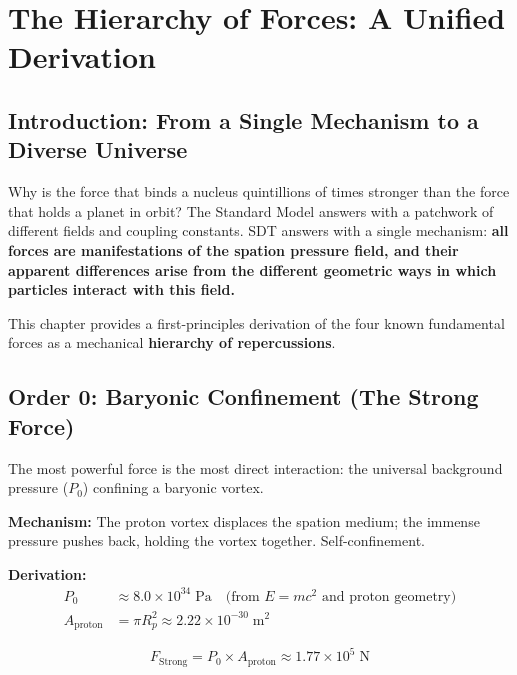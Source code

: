 \chapter{The Hierarchy of Forces: A Unified Derivation}


\section{Introduction: From a Single Mechanism to a Diverse Universe}

Why is the force that binds a nucleus quintillions of times stronger than the force that holds a planet in orbit?  The Standard Model answers with a patchwork of different fields and coupling constants.  SDT answers with a single mechanism: \textbf{all forces are manifestations of the spation pressure field, and their apparent differences arise from the different geometric ways in which particles interact with this field.}

This chapter provides a first-principles derivation of the four known fundamental forces as a mechanical \textbf{hierarchy of repercussions}.


\section{Order 0: Baryonic Confinement (The Strong Force)}

The most powerful force is the most direct interaction: the universal background pressure ($P_0$) confining a baryonic vortex.

\textbf{Mechanism:} The proton vortex displaces the spation medium; the immense pressure pushes back, holding the vortex together.  Self-confinement.

\textbf{Derivation:}
\begin{align}
  P_0 &\approx 8.0 \times 10^{34}\;\text{Pa} \quad\text{(from $E = mc^2$ and proton geometry)} \\
  A_{\text{proton}} &= \pi R_p^2 \approx 2.22 \times 10^{-30}\;\text{m}^2
\end{align}

\begin{equation}\label{eq:F-strong}
  \boxed{F_{\text{Strong}} = P_0 \times A_{\text{proton}} \approx 1.77 \times 10^5\;\text{N}}
\end{equation}

